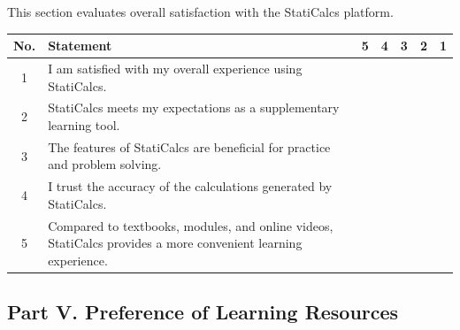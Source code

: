 This section evaluates overall satisfaction with the StatiCalcs platform.  

\vspace{0.3cm}

\begin{tabular}{c p{7cm} c c c c c}
\hline
\textbf{No.} & \textbf{Statement} & \textbf{5} & \textbf{4} & \textbf{3} & \textbf{2} & \textbf{1} \\
\hline
1 & I am satisfied with my overall experience using StatiCalcs. & \fbox{\rule{0pt}{0.2cm}\rule{0.2cm}{0pt}} & \fbox{\rule{0pt}{0.2cm}\rule{0.2cm}{0pt}} & \fbox{\rule{0pt}{0.2cm}\rule{0.2cm}{0pt}} & \fbox{\rule{0pt}{0.2cm}\rule{0.2cm}{0pt}} & \fbox{\rule{0pt}{0.2cm}\rule{0.2cm}{0pt}} \\
2 & StatiCalcs meets my expectations as a supplementary learning tool. & \fbox{\rule{0pt}{0.2cm}\rule{0.2cm}{0pt}} & \fbox{\rule{0pt}{0.2cm}\rule{0.2cm}{0pt}} & \fbox{\rule{0pt}{0.2cm}\rule{0.2cm}{0pt}} & \fbox{\rule{0pt}{0.2cm}\rule{0.2cm}{0pt}} & \fbox{\rule{0pt}{0.2cm}\rule{0.2cm}{0pt}} \\
3 & The features of StatiCalcs are beneficial for practice and problem solving. & \fbox{\rule{0pt}{0.2cm}\rule{0.2cm}{0pt}} & \fbox{\rule{0pt}{0.2cm}\rule{0.2cm}{0pt}} & \fbox{\rule{0pt}{0.2cm}\rule{0.2cm}{0pt}} & \fbox{\rule{0pt}{0.2cm}\rule{0.2cm}{0pt}} & \fbox{\rule{0pt}{0.2cm}\rule{0.2cm}{0pt}} \\
4 & I trust the accuracy of the calculations generated by StatiCalcs. & \fbox{\rule{0pt}{0.2cm}\rule{0.2cm}{0pt}} & \fbox{\rule{0pt}{0.2cm}\rule{0.2cm}{0pt}} & \fbox{\rule{0pt}{0.2cm}\rule{0.2cm}{0pt}} & \fbox{\rule{0pt}{0.2cm}\rule{0.2cm}{0pt}} & \fbox{\rule{0pt}{0.2cm}\rule{0.2cm}{0pt}} \\
5 & Compared to textbooks, modules, and online videos, StatiCalcs provides a more convenient learning experience. & \fbox{\rule{0pt}{0.2cm}\rule{0.2cm}{0pt}} & \fbox{\rule{0pt}{0.2cm}\rule{0.2cm}{0pt}} & \fbox{\rule{0pt}{0.2cm}\rule{0.2cm}{0pt}} & \fbox{\rule{0pt}{0.2cm}\rule{0.2cm}{0pt}} & \fbox{\rule{0pt}{0.2cm}\rule{0.2cm}{0pt}} \\
\hline
\end{tabular}

\vspace{8cm}
\subsection*{Part V. Preference of Learning Resources}

